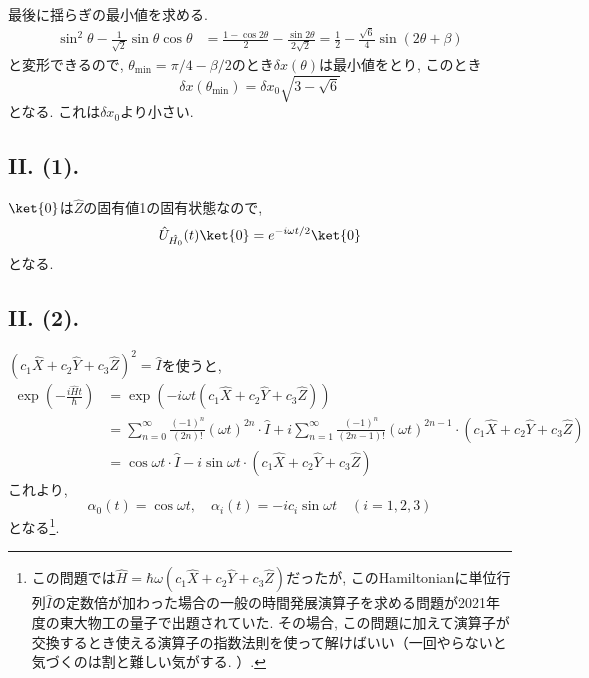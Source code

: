 最後に揺らぎの最小値を求める. 
\begin{align*}
  \sin^2\theta-\frac{1}{\sqrt{2}}\sin\theta\cos\theta&=\frac{1-\cos 2\theta}{2}-\frac{\sin 2\theta}{2\sqrt{2}}
  =\frac{1}{2}-\frac{\sqrt{6}}{4}\sin(2\theta+\beta)
\end{align*}
と変形できるので, $\theta_{\text{min}}={\pi}/{4}-{\beta}/{2}$のとき$\delta x(\theta)$は最小値をとり, このとき
\begin{equation}
  \delta x(\theta_{\text{min}})=\delta x_0\sqrt{3-\sqrt{6}}
\end{equation}
となる. 
これは$\delta x_0$より小さい. 


\subsection*{II. (1). }
$\ket{0}$は$\hat{Z}$の固有値1の固有状態なので, 
\begin{equation}
  \hat{U}_{\hat{H_0}}(t)\ket{0}=e^{-{i\omega t}/{2}}\ket{0}
\end{equation}
となる. 

\subsection*{II. (2). }
$(c_1\hat{X}+c_2\hat{Y}+c_3\hat{Z})^2=\hat{I}$を使うと, 
\begin{align*}
  \exp(-\frac{i\hat{H}t}{\hbar})&=\exp(-i\omega t(c_1\hat{X}+c_2\hat{Y}+c_3\hat{Z}))\\
  &=\sum_{n=0}^\infty\frac{(-1)^n}{(2n)!}(\omega t)^{2n}\cdot\hat{I}+i\sum_{n=1}^\infty\frac{(-1)^n}{(2n-1)!}(\omega t)^{2n-1}\cdot(c_1\hat{X}+c_2\hat{Y}+c_3\hat{Z})\\
  &=\cos\omega t\cdot\hat{I}-i\sin\omega t\cdot (c_1\hat{X}+c_2\hat{Y}+c_3\hat{Z})
\end{align*}
これより, 
\begin{equation}
  \alpha_0(t)=\cos\omega t, \quad \alpha_i(t)=-ic_i\sin\omega t \quad (i=1,2,3)
\end{equation}
となる\footnote{この問題では$\hat{H}=\hbar\omega (c_1\hat{X}+c_2\hat{Y}+c_3\hat{Z})$だったが, このHamiltonianに単位行列$\hat{I}$の定数倍が加わった場合の一般の時間発展演算子を求める問題が2021年度の東大物工の量子で出題されていた. その場合, この問題に加えて演算子が交換するとき使える演算子の指数法則を使って解けばいい（一回やらないと気づくのは割と難しい気がする. ）. }. 


